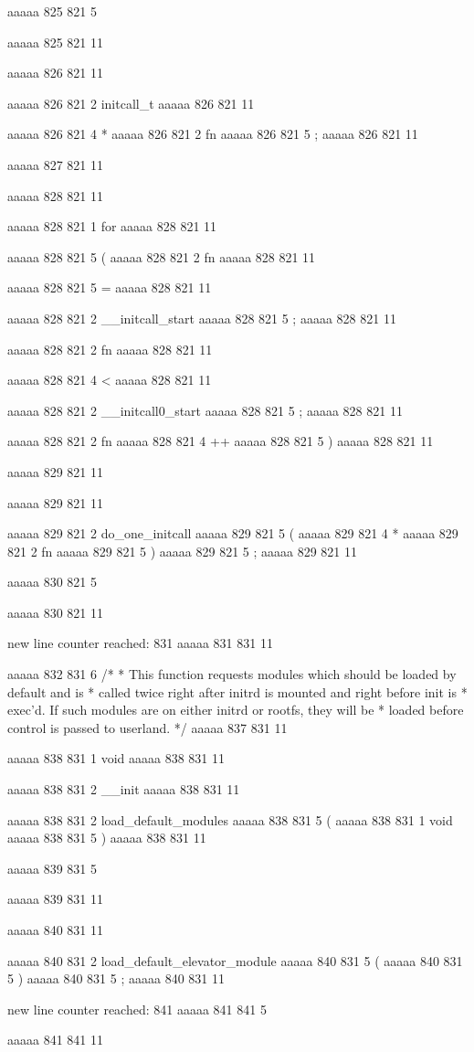 aaaaa 825 821
5
{
aaaaa 825 821
11


aaaaa 826 821
11
	
aaaaa 826 821
2
initcall_t
aaaaa 826 821
11
 
aaaaa 826 821
4
*
aaaaa 826 821
2
fn
aaaaa 826 821
5
;
aaaaa 826 821
11


aaaaa 827 821
11


aaaaa 828 821
11
	
aaaaa 828 821
1
for
aaaaa 828 821
11
 
aaaaa 828 821
5
(
aaaaa 828 821
2
fn
aaaaa 828 821
11
 
aaaaa 828 821
5
=
aaaaa 828 821
11
 
aaaaa 828 821
2
__initcall_start
aaaaa 828 821
5
;
aaaaa 828 821
11
 
aaaaa 828 821
2
fn
aaaaa 828 821
11
 
aaaaa 828 821
4
<
aaaaa 828 821
11
 
aaaaa 828 821
2
__initcall0_start
aaaaa 828 821
5
;
aaaaa 828 821
11
 
aaaaa 828 821
2
fn
aaaaa 828 821
4
++
aaaaa 828 821
5
)
aaaaa 828 821
11


aaaaa 829 821
11
	
aaaaa 829 821
11
	
aaaaa 829 821
2
do_one_initcall
aaaaa 829 821
5
(
aaaaa 829 821
4
*
aaaaa 829 821
2
fn
aaaaa 829 821
5
)
aaaaa 829 821
5
;
aaaaa 829 821
11


aaaaa 830 821
5
}
aaaaa 830 821
11


new line counter reached: 831
aaaaa 831 831
11


aaaaa 832 831
6
/*
 * This function requests modules which should be loaded by default and is
 * called twice right after initrd is mounted and right before init is
 * exec'd.  If such modules are on either initrd or rootfs, they will be
 * loaded before control is passed to userland.
 */
aaaaa 837 831
11


aaaaa 838 831
1
void
aaaaa 838 831
11
 
aaaaa 838 831
2
__init
aaaaa 838 831
11
 
aaaaa 838 831
2
load_default_modules
aaaaa 838 831
5
(
aaaaa 838 831
1
void
aaaaa 838 831
5
)
aaaaa 838 831
11


aaaaa 839 831
5
{
aaaaa 839 831
11


aaaaa 840 831
11
	
aaaaa 840 831
2
load_default_elevator_module
aaaaa 840 831
5
(
aaaaa 840 831
5
)
aaaaa 840 831
5
;
aaaaa 840 831
11


new line counter reached: 841
aaaaa 841 841
5
}
aaaaa 841 841
11


